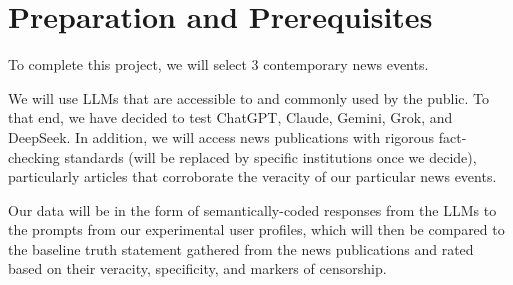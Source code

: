 \section{Preparation and Prerequisites}\label{sec:prep_pre}

To complete this project, we will select 3 contemporary news events. 

We will use LLMs that are accessible to and commonly used by the public. To that end, we have decided to test ChatGPT, Claude, Gemini, Grok, and DeepSeek.
In addition, we will access news publications with rigorous fact-checking standards (will be replaced by specific institutions once we decide), particularly articles that corroborate the veracity of our particular news events.

Our data will be in the form of semantically-coded responses from the LLMs to the prompts from our experimental user profiles, which will then be compared to the baseline truth statement gathered from the news publications and rated based on their veracity, specificity, and markers of censorship.
